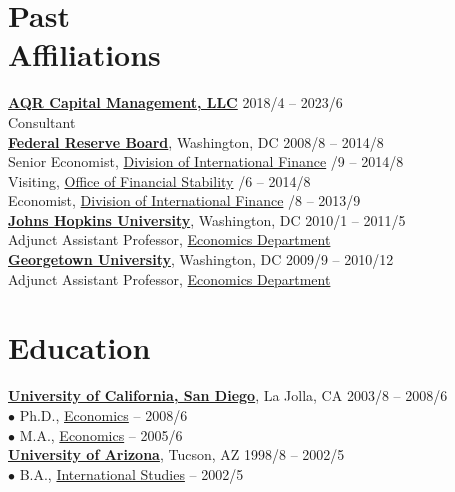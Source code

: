 \documentclass[margin,line,12pt]{res}
\begin{document}
\begin{resume}
\section{\sc\small Past \\ Affiliations}
\href{http://www.aqr.com}{\bf AQR Capital Management, LLC} \hfill {2018/4 -- 2023/6}\\
\phantom{$\bullet$} Consultant\\
\href{http://www.federalreserve.gov/}{\bf Federal Reserve Board}, Washington, DC \hfill {2008/8 -- 2014/8}\\
\phantom{$\bullet$} Senior Economist, \href{http://www.federalreserve.gov/econresdata/ifstaff.htm}{Division of International Finance} /9 -- 2014/8\\
\phantom{$\bullet$} \phantom{coo} Visiting, \href{http://www.federalreserve.gov/econresdata/fsprstaff.htm}{Office of Financial Stability} /6 -- 2014/8\\
\phantom{$\bullet$} Economist, \href{http://www.federalreserve.gov/econresdata/ifstaff.htm}{Division of International Finance} /8 -- 2013/9
\\
\phantom{$\bullet$}\phantom{$\bullet$}\href{http://advanced.jhu.edu/academic/applied-economics/}{\bf Johns Hopkins University}, Washington, DC \hfill 2010/1 -- 2011/5\\
\phantom{$\bullet$}\phantom{$\bullet$}\phantom{$\bullet$}\phantom{$\bullet$} Adjunct Assistant Professor, \href{http://advanced.jhu.edu/faculty/view/?id=1032}{Economics Department} \\
\phantom{$\bullet$}\phantom{$\bullet$}\href{http://www.georgetown.edu/}{\bf Georgetown University}, Washington, DC \hfill 2009/9 -- 2010/12\\
\phantom{$\bullet$}\phantom{$\bullet$}\phantom{$\bullet$}\phantom{$\bullet$} Adjunct Assistant Professor, \href{http://econ.georgetown.edu/}{Economics Department}


\section{\sc\small Education}
\href{http://ucsd.edu}{\bf University of California, San Diego}, La Jolla, CA \hfill {2003/8 -- 2008/6}\\
$\bullet$ Ph.D., \href{http://econ.ucsd.edu}{Economics} -- 2008/6\\
$\bullet$ M.A., \href{http://econ.ucsd.edu}{Economics} --  2005/6\\
\href{http://arizona.edu/}{\bf University of Arizona}, Tucson, AZ \hfill {1998/8 -- 2002/5} \\
$\bullet$ B.A., \href{http://www.honors.arizona.edu}{International Studies} -- 2002/5


\end{resume}
\end{document}
